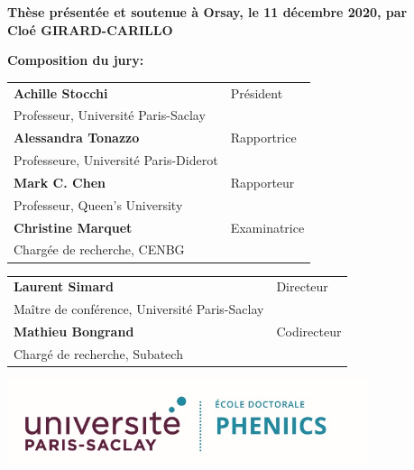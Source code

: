 \documentclass[12pt,a4paper]{book}
\begin{document}
\begin{titlepage}
\textbf{Thèse présentée et soutenue à Orsay, le 11 décembre 2020, par}\\
\bigskip
\Large {\color{Prune} \textbf{Cloé GIRARD-CARILLO}}


\vspace{\fill} %

\flushleft \small \textbf{Composition du jury:}
\bigskip


\scriptsize
\begin{tabular}{|p{8cm}l}
\arrayrulecolor{Prune}
\textbf{Achille Stocchi} &   Président\\
Professeur, Université Paris-Saclay & \\
\textbf{Alessandra Tonazzo} &  Rapportrice \\
Professeure, Université Paris-Diderot   &   \\
\textbf{Mark C. Chen} &  Rapporteur \\
Professeur, Queen's University  &   \\
\textbf{Christine Marquet} &  Examinatrice \\
Chargée de recherche, CENBG   &   \\

\end{tabular}

\medskip
\begin{tabular}{|p{8cm}l}\arrayrulecolor{white}
\textbf{Laurent Simard} &   Directeur\\
Maître de conférence, Université Paris-Saclay & \\
\textbf{Mathieu Bongrand} &   Codirecteur\\
Chargé de recherche, Subatech  &   \\


\end{tabular}


\end{titlepage}
\ifthispageodd{\newpage\thispagestyle{empty}\null\newpage}{}
\thispagestyle{empty}
\selectfont

\lhead{}
\rhead{}
\rfoot{}
\cfoot{}
\lfoot{}

\noindent
\includegraphics[height=2.45cm]{PHENIICS.jpeg}
\vspace{1cm}
\end{document}
